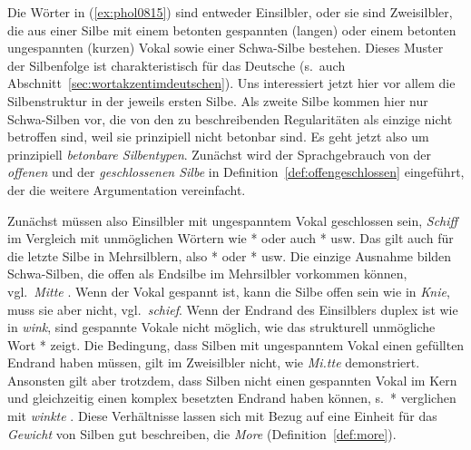 Die Wörter in (\ref{ex:phol0815}) sind entweder Einsilbler, oder sie sind Zweisilbler, die aus einer Silbe mit einem betonten gespannten (langen) oder einem betonten ungespannten (kurzen) Vokal sowie einer Schwa-Silbe bestehen.
Dieses Muster der Silbenfolge ist charakteristisch für das Deutsche (s.\ auch Abschnitt~\ref{sec:wortakzentimdeutschen}).
Uns interessiert jetzt hier vor allem die Silbenstruktur in der jeweils ersten Silbe.
Als zweite Silbe kommen hier nur Schwa-Silben vor, die von den zu beschreibenden Regularitäten als einzige nicht betroffen sind, weil sie prinzipiell nicht betonbar sind.
Es geht jetzt also um prinzipiell \textit{betonbare Silbentypen}.
Zunächst wird der Sprachgebrauch von der \textit{offenen} und der \textit{geschlossenen Silbe} in Definition~\ref{def:offengeschlossen} eingeführt, der die weitere Argumentation vereinfacht.




Zunächst müssen also Einsilbler mit ungespanntem Vokal geschlossen sein, \zB \textit{Schiff} im Vergleich mit unmöglichen Wörtern wie *\textipa{[knI]} oder auch *\textipa{[tO]} usw.
Das gilt auch für die letzte Silbe in Mehrsilblern, also *\textipa{[kUn.dI]} oder *\textipa{[tu:.bO]} usw.
Die einzige Ausnahme bilden Schwa-Silben, die offen als Endsilbe im Mehrsilbler vorkommen können, vgl.\ \textit{Mitte} \textipa{[mi.t@]}.
Wenn der Vokal gespannt ist, kann die Silbe offen sein wie in \textit{Knie}, muss sie aber nicht, vgl.\ \textit{schief}.
Wenn der Endrand des Einsilblers duplex ist wie in \textit{wink}, sind gespannte Vokale nicht möglich, wie das strukturell unmögliche Wort *\textipa{[vi:Nk]} zeigt.
Die Bedingung, dass Silben mit ungespanntem Vokal einen gefüllten Endrand haben müssen, gilt im Zweisilbler nicht, wie \textit{Mi.tte} demonstriert.
Ansonsten gilt aber trotzdem, dass Silben nicht einen gespannten Vokal im Kern und gleichzeitig einen komplex besetzten Endrand haben können, s.\ *\textipa{[vi:Nk.t@]} verglichen mit \textit{winkte} \textipa{[vINk.t@]}.
Diese Verhältnisse lassen sich mit Bezug auf eine Einheit für das \textit{Gewicht} von Silben gut beschreiben, die \textit{More} (Definition~\ref{def:more}).



